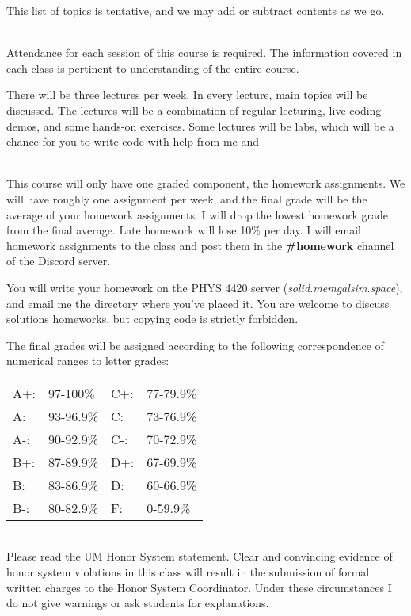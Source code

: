\documentclass[11pt]{article}
\begin{document}
This list of topics is tentative, and we may add or subtract contents as we go.

\medskip{}\\ 
Attendance for each session of this course is required. The information covered in each class is pertinent to understanding of the entire course. 

There will be three lectures per week. In every lecture, main topics will be discussed. The lectures will be a combination
of regular lecturing, live-coding demos, and some hands-on exercises.  Some lectures will be labs, which will be a chance
for you to write code with help from me and 

\medskip{}\\ 
This course will only have one graded component, the homework assignments.  We will have roughly one assignment per week,
and the final grade will be the average of your homework assignments.  I will drop the lowest homework grade from the final
average.  Late homework will lose 10\% per day.  I will email homework assignments to the class and post them in the \textbf{\#homework}
 channel of the Discord server.

You will write your homework on the PHYS 4420 server (\textit{solid.memgalsim.space}), and email me the directory where
you've placed it.  You are welcome to discuss solutions homeworks, but copying code is strictly forbidden.

The final grades will be assigned according to the following correspondence of
numerical ranges to letter grades:

\begin{center}
\begin{tabular}{|l l | l l|}
    \hline
    A+: & 97-100\% &  C+: & 77-79.9\% \\
    A:  & 93-96.9\% & C:  & 73-76.9\% \\
    A-: & 90-92.9\% & C-: & 70-72.9\% \\

    B+: & 87-89.9\% & D+: & 67-69.9\% \\
    B:  & 83-86.9\% & D:  & 60-66.9\% \\
    B-: & 80-82.9\% & F:  & 0-59.9\% \\
    \hline
\end{tabular}
\end{center}

\medskip{}\\ 
Please read the UM Honor System statement. Clear and convincing evidence of honor system violations in this class will result in the submission of formal written charges to the Honor System Coordinator. Under these circumstances I do not give warnings or ask students for explanations.
\end{document}
